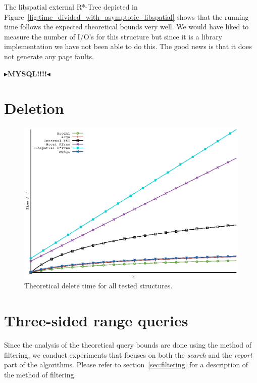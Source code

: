 \documentclass[twoside,11pt,openright]{report}
\newcommand{\todo}[1]{{\color[rgb]{.5,0,0}\textbf{$\blacktriangleright$#1$\blacktriangleleft$}}}
\begin{document}
The libspatial external R*-Tree depicted in Figure~\ref{fig:time_divided_with_asymptotic_libspatial} shows that the running time follows the expected theoretical bounds very well. We would have liked to measure the number of I/O's for this structure but since it is a library implementation we have not been able to do this. The good news is that it does not generate any page faults.

\todo{MYSQL!!!!}

\section{Deletion}
\begin{figure}[htp!]
\includegraphics[width=\textwidth]{../plots/delete_complexities/delete_complexity}
\caption{Theoretical delete time for all tested structures.}
\label{fig:theory_delete_complexity}
\end{figure}

\section{Three-sided range queries}
Since the analysis of the theoretical query bounds are done using the method of filtering, we conduct experiments that focuses on both the \textit{search} and the \textit{report} part of the algorithms. Please refer to section~\ref{sec:filtering} for a description of the method of filtering.
\end{document}
